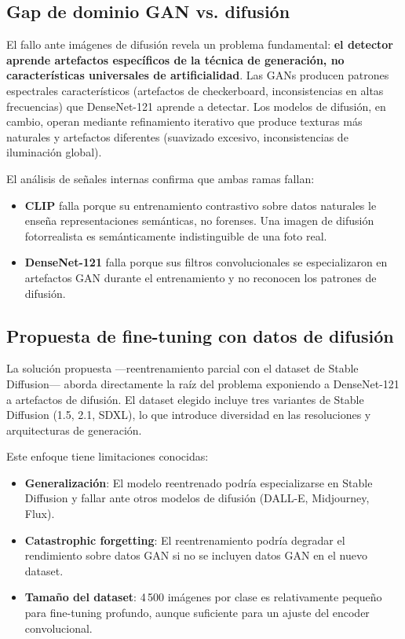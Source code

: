 \documentclass[pdflatex,sn-mathphys-num]{sn-jnl}
\begin{document}
\subsection{Gap de dominio GAN vs. difusión}

El fallo ante imágenes de difusión revela un problema fundamental: \textbf{el detector aprende artefactos específicos de la técnica de generación, no características universales de artificialidad}. Las GANs producen patrones espectrales característicos (artefactos de checkerboard, inconsistencias en altas frecuencias) que DenseNet-121 aprende a detectar. Los modelos de difusión, en cambio, operan mediante refinamiento iterativo que produce texturas más naturales y artefactos diferentes (suavizado excesivo, inconsistencias de iluminación global).

El análisis de señales internas confirma que ambas ramas fallan:
\begin{itemize}
    \item \textbf{CLIP} falla porque su entrenamiento contrastivo sobre datos naturales le enseña representaciones semánticas, no forenses. Una imagen de difusión fotorrealista es semánticamente indistinguible de una foto real.
    \item \textbf{DenseNet-121} falla porque sus filtros convolucionales se especializaron en artefactos GAN durante el entrenamiento y no reconocen los patrones de difusión.
\end{itemize}

\subsection{Propuesta de fine-tuning con datos de difusión}

La solución propuesta ---reentrenamiento parcial con el dataset de Stable Diffusion--- aborda directamente la raíz del problema exponiendo a DenseNet-121 a artefactos de difusión. El dataset elegido incluye tres variantes de Stable Diffusion (1.5, 2.1, SDXL), lo que introduce diversidad en las resoluciones y arquitecturas de generación.

Este enfoque tiene limitaciones conocidas:
\begin{itemize}
    \item \textbf{Generalización}: El modelo reentrenado podría especializarse en Stable Diffusion y fallar ante otros modelos de difusión (DALL-E, Midjourney, Flux).
    \item \textbf{Catastrophic forgetting}: El reentrenamiento podría degradar el rendimiento sobre datos GAN si no se incluyen datos GAN en el nuevo dataset.
    \item \textbf{Tamaño del dataset}: 4\,500 imágenes por clase es relativamente pequeño para fine-tuning profundo, aunque suficiente para un ajuste del encoder convolucional.
\end{itemize}
\end{document}
